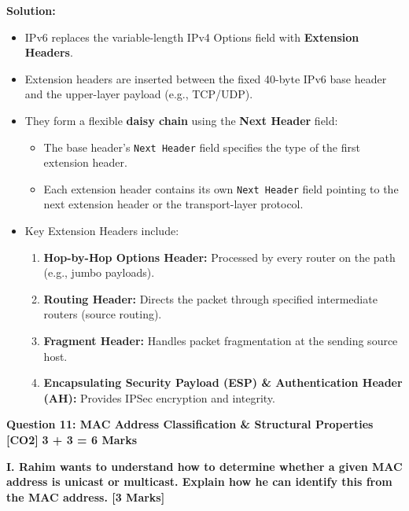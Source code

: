 \documentclass[11pt,a4paper]{article}
\newcommand{\questionheader}[3]{
    \vspace{0.35cm}
    \noindent\colorbox{qboxbg}{
        \parbox{\dimexpr\textwidth-2\fboxsep\relax}{
            \textbf{\textcolor{primary}{\large #1}} \hfill \textbf{\textcolor{accent}{[#2]}} \hfill \textbf{\textcolor{secondary}{#3 Marks}}
        }
    }
    \vspace{0.15cm}
}
\begin{document}
\textbf{Solution:}
\begin{itemize}
    \item IPv6 replaces the variable-length IPv4 Options field with \textbf{Extension Headers}.
    \item Extension headers are inserted between the fixed 40-byte IPv6 base header and the upper-layer payload (e.g., TCP/UDP).
    \item They form a flexible \textbf{daisy chain} using the \textbf{Next Header} field:
    \begin{itemize}
        \item The base header's \texttt{Next Header} field specifies the type of the first extension header.
        \item Each extension header contains its own \texttt{Next Header} field pointing to the next extension header or the transport-layer protocol.
    \end{itemize}
    \item Key Extension Headers include:
    \begin{enumerate}
        \item \textbf{Hop-by-Hop Options Header:} Processed by every router on the path (e.g., jumbo payloads).
        \item \textbf{Routing Header:} Directs the packet through specified intermediate routers (source routing).
        \item \textbf{Fragment Header:} Handles packet fragmentation at the sending source host.
        \item \textbf{Encapsulating Security Payload (ESP) \& Authentication Header (AH):} Provides IPSec encryption and integrity.
    \end{enumerate}
\end{itemize}

\questionheader{Question 11: MAC Address Classification \& Structural Properties}{CO2}{3 + 3 = 6}

\textbf{I. Rahim wants to understand how to determine whether a given MAC address is unicast or multicast. Explain how he can identify this from the MAC address. [3 Marks]}
\end{document}
